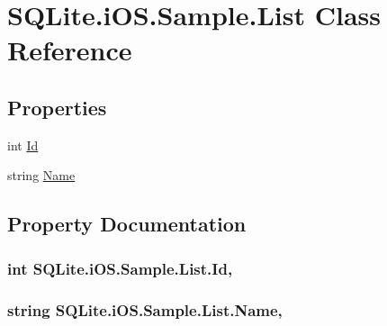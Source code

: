 \hypertarget{class_s_q_lite_1_1i_o_s_1_1_sample_1_1_list}{\section{S\+Q\+Lite.\+i\+O\+S.\+Sample.\+List Class Reference}
\label{class_s_q_lite_1_1i_o_s_1_1_sample_1_1_list}
}
\subsection*{Properties}
\begin{DoxyCompactItemize}
\item 
int \hyperlink{class_s_q_lite_1_1i_o_s_1_1_sample_1_1_list_aa9d74a2c1fe6e98292894b076d64be4e}{Id}
\item 
string \hyperlink{class_s_q_lite_1_1i_o_s_1_1_sample_1_1_list_a1651c37a4999116e15e47e475abe8af3}{Name}
\end{DoxyCompactItemize}


\subsection{Property Documentation}
\hypertarget{class_s_q_lite_1_1i_o_s_1_1_sample_1_1_list_aa9d74a2c1fe6e98292894b076d64be4e}{
\subsubsection[{Id}]{\setlength{\rightskip}{0pt plus 5cm}int S\+Q\+Lite.\+i\+O\+S.\+Sample.\+List.\+Id\hspace{0.3cm}{\ttfamily [get]}, {\ttfamily [set]}}}\label{class_s_q_lite_1_1i_o_s_1_1_sample_1_1_list_aa9d74a2c1fe6e98292894b076d64be4e}
\hypertarget{class_s_q_lite_1_1i_o_s_1_1_sample_1_1_list_a1651c37a4999116e15e47e475abe8af3}{
\subsubsection[{Name}]{\setlength{\rightskip}{0pt plus 5cm}string S\+Q\+Lite.\+i\+O\+S.\+Sample.\+List.\+Name\hspace{0.3cm}{\ttfamily [get]}, {\ttfamily [set]}}}\label{class_s_q_lite_1_1i_o_s_1_1_sample_1_1_list_a1651c37a4999116e15e47e475abe8af3}


